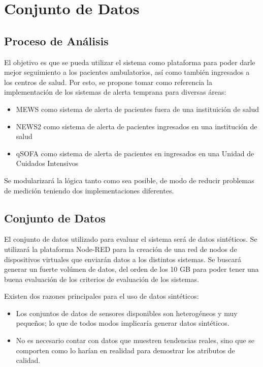 \section{Conjunto de Datos}

\subsection{Proceso de Análisis}

El objetivo es que se pueda utilizar el sistema como plataforma para poder darle mejor seguimiento a los pacientes ambulatorios,
así como también ingresados a los centros de salud. 
Por esto, se propone tomar como referencia la implementación de los sistemas de alerta temprana para diversas áreas: 

\begin{itemize}
    \item MEWS como sistema de alerta de pacientes fuera de una instituición de salud
    \item NEWS2 como sistema de alerta de pacientes ingresados en una institución de salud
    \item qSOFA como sistema de alerta de pacientes en ingresados en una Unidad de Cuidados Intensivos
\end{itemize}

Se modularizará la lógica tanto como sea posible, de modo de reducir problemas de medición teniendo dos implementaciones diferentes. 
\newpage

\subsection{Conjunto de Datos}

El conjunto de datos utilizado para evaluar el sistema será de datos sintéticos. 
Se utilizará la plataforma Node-RED para la creación de una red de nodos de dispositivos virtuales que enviarán datos a los distintos sistemas. 
Se buscará generar un fuerte volúmen de datos, del orden de los 10 GB para poder tener una buena evaluación de los criterios de evaluación de los sistemas. 

Existen dos razones principales para el uso de datos sintéticos: 

\begin{itemize}
    \item Los conjuntos de datos de sensores disponibles son heterogéneos y muy pequeños; lo que de todos modos implicaría generar datos sintéticos.
    \item No es necesario contar con datos que muestren tendencias reales, sino que se comporten como lo harían en realidad para demostrar los atributos de calidad.
\end{itemize}

